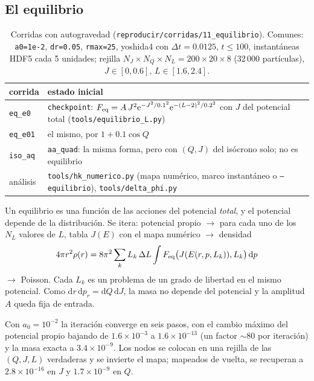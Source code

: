 \documentclass[11pt,a4paper]{article}
\newcommand{\dd}{\mathrm{d}}
\newcommand{\ee}{\mathrm{e}}
\begin{document}
\subsection{El equilibrio}

\begin{table}[ht]
\centering
\small
\caption{Corridas con autogravedad (\texttt{reproducir/corridas/11\_equilibrio}).
Comunes: \texttt{a0=1e-2}, \texttt{dr=0.05}, \texttt{rmax=25}, yoshida4 con $\Delta
t=0.0125$, $t\leq100$, instantáneas HDF5 cada 5 unidades; rejilla $N_J\times N_Q\times
N_L=200\times20\times8$ (32\,000 partículas), $J\in[0,0.6]$, $L\in[1.6,2.4]$.}
\label{tab:equilibrio}
\begin{tabular}{p{}p{}}
\toprule
corrida & estado inicial \\
\midrule
\texttt{eq\_e0}  & \texttt{checkpoint}: $F_{\rm eq}=A\,J^2\ee^{-J^2/0.1^2}\ee^{-(L-2)^2/0.2^2}$ con $J$ del potencial total (\texttt{tools/equilibrio\_L.py}) \\
\texttt{eq\_e01} & el mismo, por $1+0.1\cos Q$ \\
\texttt{iso\_aq} & \texttt{aa\_quad}: la misma forma, pero con $(Q,J)$ del isócrono solo; no es equilibrio \\
\midrule
análisis & \texttt{tools/hk\_numerico.py} (mapa numérico, marco instantáneo o \texttt{--equilibrio}), \texttt{tools/delta\_phi.py} \\
\bottomrule
\end{tabular}
\end{table}

Un equilibrio es una función de las acciones del potencial \emph{total}, y el potencial
depende de la distribución. Se itera: potencial propio $\to$ para cada uno de los $N_L$
valores de $L$, tabla $J(E)$ con el mapa numérico $\to$ densidad
\begin{equation}
  4\pi r^2\rho(r)=8\pi^2\sum_kL_k\,\Delta L\int F_{\rm eq}\big(J(E(r,p,L_k)),L_k\big)\,\dd p
\end{equation}
$\to$ Poisson. Cada $L_k$ es un problema de un grado de libertad en el mismo potencial.
Como $\dd r\,\dd p_r=\dd Q\,\dd J$, la masa no depende del potencial y la amplitud $A$
queda fija de entrada.

Con $a_0=10^{-2}$ la iteración converge en seis pasos, con el cambio máximo del
potencial propio bajando de $1.6\times10^{-3}$ a $1.6\times10^{-13}$ (un factor $\sim80$ por
iteración) y la masa exacta a $3.4\times10^{-9}$. Los nodos se colocan en una rejilla de
las $(Q,J,L)$ verdaderas y se invierte el mapa; mapeados de vuelta, se recuperan a
$2.8\times10^{-16}$ en $J$ y $1.7\times10^{-9}$ en $Q$.
\end{document}
